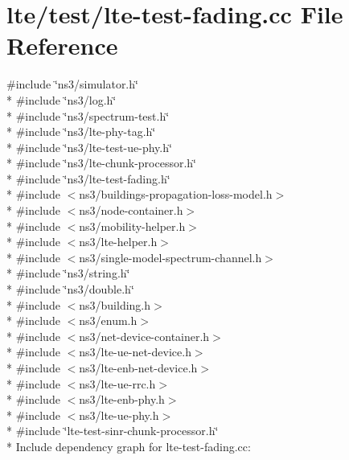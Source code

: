 \hypertarget{lte-test-fading_8cc}{}\section{lte/test/lte-\/test-\/fading.cc File Reference}
\label{lte-test-fading_8cc}
{\ttfamily \#include \char`\"{}ns3/simulator.\+h\char`\"{}}\\*
{\ttfamily \#include \char`\"{}ns3/log.\+h\char`\"{}}\\*
{\ttfamily \#include \char`\"{}ns3/spectrum-\/test.\+h\char`\"{}}\\*
{\ttfamily \#include \char`\"{}ns3/lte-\/phy-\/tag.\+h\char`\"{}}\\*
{\ttfamily \#include \char`\"{}ns3/lte-\/test-\/ue-\/phy.\+h\char`\"{}}\\*
{\ttfamily \#include \char`\"{}ns3/lte-\/chunk-\/processor.\+h\char`\"{}}\\*
{\ttfamily \#include \char`\"{}ns3/lte-\/test-\/fading.\+h\char`\"{}}\\*
{\ttfamily \#include $<$ns3/buildings-\/propagation-\/loss-\/model.\+h$>$}\\*
{\ttfamily \#include $<$ns3/node-\/container.\+h$>$}\\*
{\ttfamily \#include $<$ns3/mobility-\/helper.\+h$>$}\\*
{\ttfamily \#include $<$ns3/lte-\/helper.\+h$>$}\\*
{\ttfamily \#include $<$ns3/single-\/model-\/spectrum-\/channel.\+h$>$}\\*
{\ttfamily \#include \char`\"{}ns3/string.\+h\char`\"{}}\\*
{\ttfamily \#include \char`\"{}ns3/double.\+h\char`\"{}}\\*
{\ttfamily \#include $<$ns3/building.\+h$>$}\\*
{\ttfamily \#include $<$ns3/enum.\+h$>$}\\*
{\ttfamily \#include $<$ns3/net-\/device-\/container.\+h$>$}\\*
{\ttfamily \#include $<$ns3/lte-\/ue-\/net-\/device.\+h$>$}\\*
{\ttfamily \#include $<$ns3/lte-\/enb-\/net-\/device.\+h$>$}\\*
{\ttfamily \#include $<$ns3/lte-\/ue-\/rrc.\+h$>$}\\*
{\ttfamily \#include $<$ns3/lte-\/enb-\/phy.\+h$>$}\\*
{\ttfamily \#include $<$ns3/lte-\/ue-\/phy.\+h$>$}\\*
{\ttfamily \#include \char`\"{}lte-\/test-\/sinr-\/chunk-\/processor.\+h\char`\"{}}\\*
Include dependency graph for lte-\/test-\/fading.cc\+:

